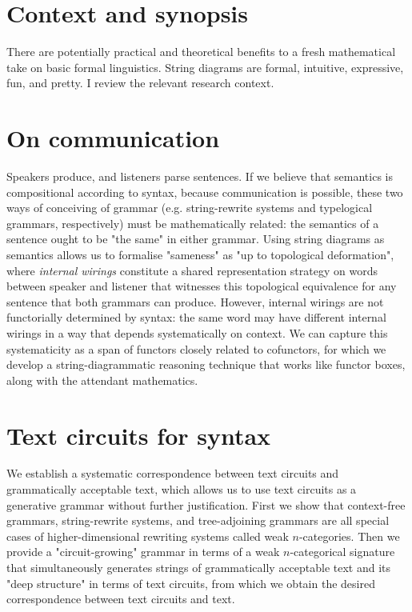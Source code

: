\chapter{Context and synopsis}
There are potentially practical and theoretical benefits to a fresh mathematical take on basic formal linguistics. String diagrams are formal, intuitive, expressive, fun, and pretty. I review the relevant research context.
\clearpage
\newpage

\clearpage
\newpage

\clearpage
\newpage

\label{ch:oneandhalf}

\clearpage
\newpage

\chapter{On communication}\label{chapter:internalwirings}
Speakers produce, and listeners parse sentences. If we believe that semantics is compositional according to syntax, because communication is possible, these two ways of conceiving of grammar (e.g. string-rewrite systems and typelogical grammars, respectively) must be mathematically related: the semantics of a sentence ought to be "the same" in either grammar. Using string diagrams as semantics allows us to formalise "sameness" as "up to topological deformation", where \emph{internal wirings} constitute a shared representation strategy on words between speaker and listener that witnesses this topological equivalence for any sentence that both grammars can produce. However, internal wirings are not functorially determined by syntax: the same word may have different internal wirings in a way that depends systematically on context. We can capture this systematicity as a span of functors closely related to cofunctors, for which we develop a string-diagrammatic reasoning technique that works like functor boxes, along with the attendant mathematics.
\clearpage
\newpage


\chapter{Text circuits for syntax}\label{chapter:textcircuits}
We establish a systematic correspondence between text circuits and grammatically acceptable text, which allows us to use text circuits as a generative grammar without further justification. First we show that context-free grammars, string-rewrite systems, and tree-adjoining grammars are all special cases of higher-dimensional rewriting systems called weak $n$-categories. Then we provide a "circuit-growing" grammar in terms of a weak $n$-categorical signature that simultaneously generates strings of grammatically acceptable text and its "deep structure" in terms of text circuits, from which we obtain the desired correspondence between text circuits and text.
\clearpage
\newpage

\clearpage
\newpage

\clearpage
\newpage

\clearpage

